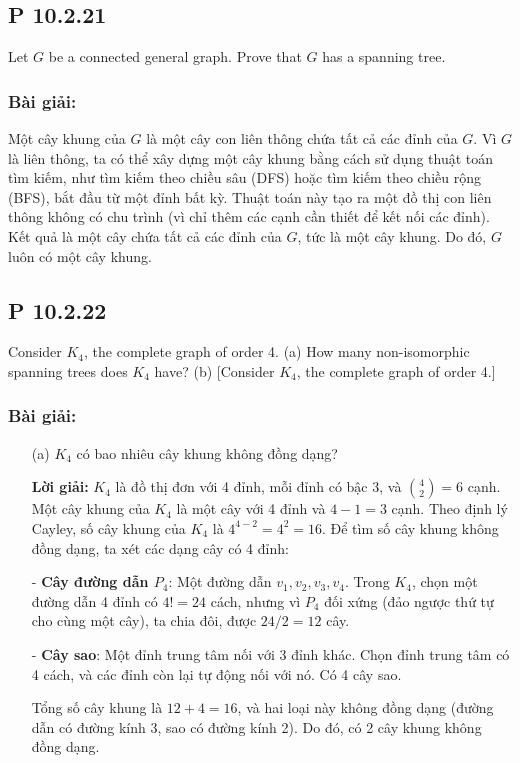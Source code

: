 \documentclass[a4paper,12pt]{article}
\begin{document}
\subsection*{P 10.2.21}
Let \( G \) be a connected general graph. Prove that \( G \) has a spanning tree.

\subsubsection*{Bài giải:}
Một cây khung của \( G \) là một cây con liên thông chứa tất cả các đỉnh của \( G \). Vì \( G \) là liên thông, ta có thể xây dựng một cây khung bằng cách sử dụng thuật toán tìm kiếm, như tìm kiếm theo chiều sâu (DFS) hoặc tìm kiếm theo chiều rộng (BFS), bắt đầu từ một đỉnh bất kỳ. Thuật toán này tạo ra một đồ thị con liên thông không có chu trình (vì chỉ thêm các cạnh cần thiết để kết nối các đỉnh). Kết quả là một cây chứa tất cả các đỉnh của \( G \), tức là một cây khung. Do đó, \( G \) luôn có một cây khung.

\subsection*{P 10.2.22}
Consider \( K_4 \), the complete graph of order 4.  
(a) How many non-isomorphic spanning trees does \( K_4 \) have?  
(b) [Consider \( K_4 \), the complete graph of order 4.]

\subsubsection*{Bài giải:}
\begin{enumerate}
    \item[(a)] \( K_4 \) có bao nhiêu cây khung không đồng dạng?

    \textbf{Lời giải:} \( K_4 \) là đồ thị đơn với 4 đỉnh, mỗi đỉnh có bậc 3, và \( \binom{4}{2} = 6 \) cạnh. Một cây khung của \( K_4 \) là một cây với 4 đỉnh và \( 4 - 1 = 3 \) cạnh. Theo định lý Cayley, số cây khung của \( K_4 \) là \( 4^{4-2} = 4^2 = 16 \). Để tìm số cây khung không đồng dạng, ta xét các dạng cây có 4 đỉnh:

    - \textbf{Cây đường dẫn \( P_4 \)}: Một đường dẫn \( v_1, v_2, v_3, v_4 \). Trong \( K_4 \), chọn một đường dẫn 4 đỉnh có \( 4! = 24 \) cách, nhưng vì \( P_4 \) đối xứng (đảo ngược thứ tự cho cùng một cây), ta chia đôi, được \( 24 / 2 = 12 \) cây.

    - \textbf{Cây sao}: Một đỉnh trung tâm nối với 3 đỉnh khác. Chọn đỉnh trung tâm có 4 cách, và các đỉnh còn lại tự động nối với nó. Có 4 cây sao.

    Tổng số cây khung là \( 12 + 4 = 16 \), và hai loại này không đồng dạng (đường dẫn có đường kính 3, sao có đường kính 2). Do đó, có 2 cây khung không đồng dạng.

\end{enumerate}
\end{document}
